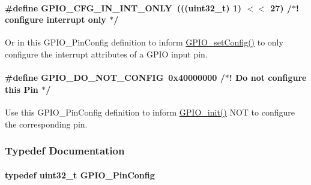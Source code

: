 \paragraph[{G\+P\+I\+O\+\_\+\+C\+F\+G\+\_\+\+I\+N\+\_\+\+I\+N\+T\+\_\+\+O\+N\+L\+Y}]{\setlength{\rightskip}{0pt plus 5cm}\#define G\+P\+I\+O\+\_\+\+C\+F\+G\+\_\+\+I\+N\+\_\+\+I\+N\+T\+\_\+\+O\+N\+L\+Y~(((uint32\+\_\+t) 1) $<$$<$ 27)                  /$\ast$! configure interrupt only $\ast$/}\label{_g_p_i_o_8h_ac8df4b49e09cb612275ed7d00e8cc1cf}


\textquotesingle{}Or\textquotesingle{} in this G\+P\+I\+O\+\_\+\+Pin\+Config definition to inform \hyperlink{_g_p_i_o_8h_ae13b9ae70c5d2993d1ac932a91c1f1fa}{G\+P\+I\+O\+\_\+set\+Config()} to only configure the interrupt attributes of a G\+P\+I\+O input pin. 

\paragraph[{G\+P\+I\+O\+\_\+\+D\+O\+\_\+\+N\+O\+T\+\_\+\+C\+O\+N\+F\+I\+G}]{\setlength{\rightskip}{0pt plus 5cm}\#define G\+P\+I\+O\+\_\+\+D\+O\+\_\+\+N\+O\+T\+\_\+\+C\+O\+N\+F\+I\+G~0x40000000                              /$\ast$! Do not configure this Pin $\ast$/}\label{_g_p_i_o_8h_a0974eb3af57b7bccef9ac749d4cf23a7}


Use this G\+P\+I\+O\+\_\+\+Pin\+Config definition to inform \hyperlink{_g_p_i_o_8h_a7aaec489dca5ac4d278d2eb3ae38a2d2}{G\+P\+I\+O\+\_\+init()} N\+O\+T to configure the corresponding pin. 



\subsubsection{Typedef Documentation}
\paragraph[{G\+P\+I\+O\+\_\+\+Pin\+Config}]{\setlength{\rightskip}{0pt plus 5cm}typedef uint32\+\_\+t {\bf G\+P\+I\+O\+\_\+\+Pin\+Config}}\label{_g_p_i_o_8h_a7f5d979226db633309b3fdc0f4a8aef6}


